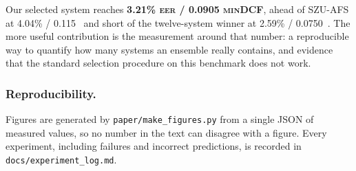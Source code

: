 \documentclass{llncs}
\newcommand{\eer}{\textsc{eer}}
\newcommand{\mindcf}{\textsc{minDCF}}
\begin{document}
Our selected system reaches \textbf{3.21\% \eer{} / 0.0905 \mindcf{}}, ahead of
SZU-AFS at 4.04\% / 0.115~\cite{szuafs} and short of the twelve-system winner at
2.59\% / 0.0750~\cite{ustc2024}.  The more useful contribution is the measurement
around that number: a reproducible way to quantify how many systems an ensemble
really contains, and evidence that the standard selection procedure on this
benchmark does not work.

\subsubsection*{Reproducibility.}
Figures are generated by \texttt{paper/make\_figures.py} from a single JSON of
measured values, so no number in the text can disagree with a figure.  Every
experiment, including failures and incorrect predictions, is recorded in
\texttt{docs/experiment\_log.md}.



\end{document}
